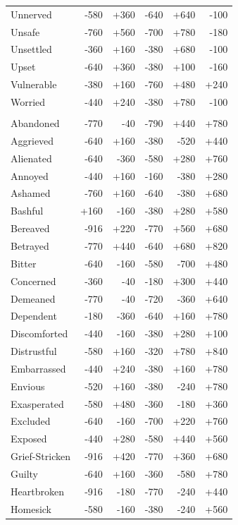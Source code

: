 \begin{longtable}{@{}p{}rrrrr}
Unnerved & -580 & +360 & -640 & +640 & -100 \\
Unsafe & -760 & +560 & -700 & +780 & -180 \\
Unsettled & -360 & +160 & -380 & +680 & -100 \\
Upset & -640 & +360 & -380 & +100 & -160 \\
Vulnerable & -380 & +160 & -760 & +480 & +240 \\
Worried & -440 & +240 & -380 & +780 & -100 \\
\addlinespace[2pt]\multicolumn{6}{@{}l}{\textbf{Socially Vulnerable} ($n=47$)} \\
Abandoned & -770 & -40 & -790 & +440 & +780 \\
Aggrieved & -640 & +160 & -380 & -520 & +440 \\
Alienated & -640 & -360 & -580 & +280 & +760 \\
Annoyed & -440 & +160 & -160 & -380 & +280 \\
Ashamed & -760 & +160 & -640 & -380 & +680 \\
Bashful & +160 & -160 & -380 & +280 & +580 \\
Bereaved & -916 & +220 & -770 & +560 & +680 \\
Betrayed & -770 & +440 & -640 & +680 & +820 \\
Bitter & -640 & -160 & -580 & -700 & +480 \\
Concerned & -360 & -40 & -180 & +300 & +440 \\
Demeaned & -770 & -40 & -720 & -360 & +640 \\
Dependent & -180 & -360 & -640 & +160 & +780 \\
Discomforted & -440 & -160 & -380 & +280 & +100 \\
Distrustful & -580 & +160 & -320 & +780 & +840 \\
Embarrassed & -440 & +240 & -380 & +160 & +780 \\
Envious & -520 & +160 & -380 & -240 & +780 \\
Exasperated & -580 & +480 & -360 & -180 & +360 \\
Excluded & -640 & -160 & -700 & +220 & +760 \\
Exposed & -440 & +280 & -580 & +440 & +560 \\
Grief-Stricken & -916 & +420 & -770 & +360 & +680 \\
Guilty & -640 & +160 & -360 & -580 & +780 \\
Heartbroken & -916 & -180 & -770 & -240 & +440 \\
Homesick & -580 & -160 & -380 & -240 & +560 \\

\end{longtable}
